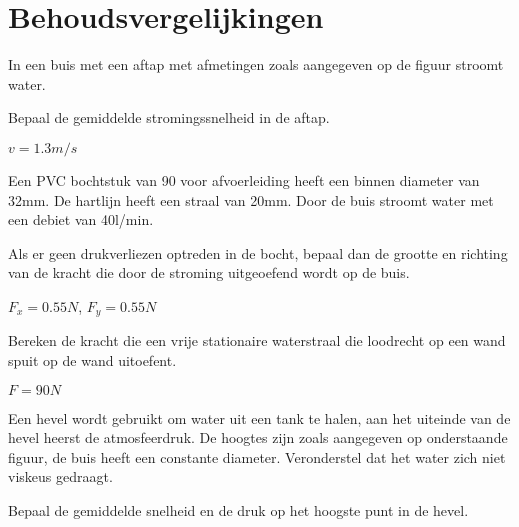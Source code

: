 \chapter{Behoudsvergelijkingen}
\label{sec:Behoudsvergelijkingen}
	\begin{toepassing}
		\label{buisaftap}
In een buis met een aftap met afmetingen zoals aangegeven op de figuur stroomt water.
		
Bepaal de gemiddelde stromingssnelheid in de aftap.
		\begin{center}
			
		\end{center}
	\end{toepassing}
	\begin{antwoord}
		$v = \unit{1.3}{m/s}$
	\end{antwoord}
	\begin{toepassing}
		\label{afvoerbocht}
Een PVC bochtstuk van \unit{90}{\degree} voor afvoerleiding heeft een binnen diameter van \unit{32}{mm}. De hartlijn heeft een straal van \unit{20}{mm}. Door de buis stroomt water met een debiet van \unit{40}{l/min}.
		
Als er geen drukverliezen optreden in de bocht, bepaal dan de grootte en richting van de kracht die door de stroming uitgeoefend wordt op de buis.
		\begin{center}
			
		\end{center}
	\end{toepassing}
	\begin{antwoord}
		$F_x = \unit{0.55}{N}$, $F_y = \unit{0.55}{N}$
	\end{antwoord}
	\begin{toepassing*}
		\label{waterstraal}
Bereken de kracht die een vrije stationaire waterstraal die loodrecht op een wand spuit op de wand uitoefent.
		\begin{center}
			
		\end{center}
	\end{toepassing*}
	\begin{antwoord}
		$F = \unit{90}{N}$
	\end{antwoord}
	\begin{toepassing*}
		\label{hevel}
Een hevel wordt gebruikt om water uit een tank te halen, aan het uiteinde van de hevel heerst de atmosfeerdruk. De hoogtes zijn zoals aangegeven op onderstaande figuur, de buis heeft een constante diameter. Veronderstel dat het water zich niet viskeus gedraagt.
		
Bepaal de gemiddelde snelheid en de druk op het hoogste punt in de hevel.
		\begin{center}
			
		\end{center}
	\end{toepassing*}
